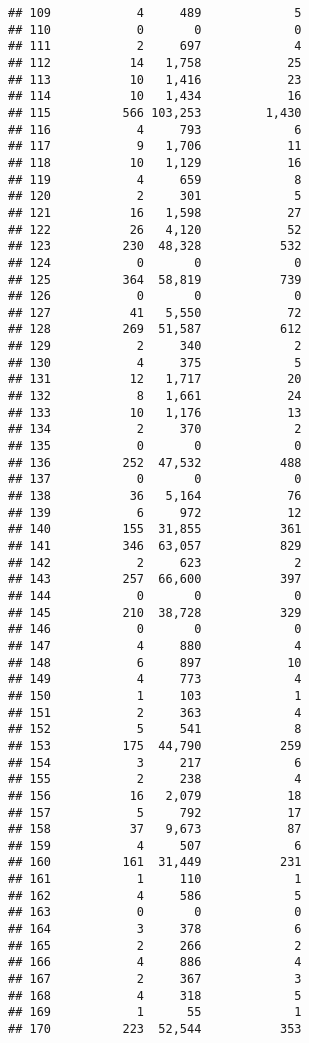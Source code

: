 \documentclass[
]{article}
\begin{document}
\begin{verbatim}
## 109            4     489             5
## 110            0       0             0
## 111            2     697             4
## 112           14   1,758            25
## 113           10   1,416            23
## 114           10   1,434            16
## 115          566 103,253         1,430
## 116            4     793             6
## 117            9   1,706            11
## 118           10   1,129            16
## 119            4     659             8
## 120            2     301             5
## 121           16   1,598            27
## 122           26   4,120            52
## 123          230  48,328           532
## 124            0       0             0
## 125          364  58,819           739
## 126            0       0             0
## 127           41   5,550            72
## 128          269  51,587           612
## 129            2     340             2
## 130            4     375             5
## 131           12   1,717            20
## 132            8   1,661            24
## 133           10   1,176            13
## 134            2     370             2
## 135            0       0             0
## 136          252  47,532           488
## 137            0       0             0
## 138           36   5,164            76
## 139            6     972            12
## 140          155  31,855           361
## 141          346  63,057           829
## 142            2     623             2
## 143          257  66,600           397
## 144            0       0             0
## 145          210  38,728           329
## 146            0       0             0
## 147            4     880             4
## 148            6     897            10
## 149            4     773             4
## 150            1     103             1
## 151            2     363             4
## 152            5     541             8
## 153          175  44,790           259
## 154            3     217             6
## 155            2     238             4
## 156           16   2,079            18
## 157            5     792            17
## 158           37   9,673            87
## 159            4     507             6
## 160          161  31,449           231
## 161            1     110             1
## 162            4     586             5
## 163            0       0             0
## 164            3     378             6
## 165            2     266             2
## 166            4     886             4
## 167            2     367             3
## 168            4     318             5
## 169            1      55             1
## 170          223  52,544           353

\end{verbatim}
\end{document}
